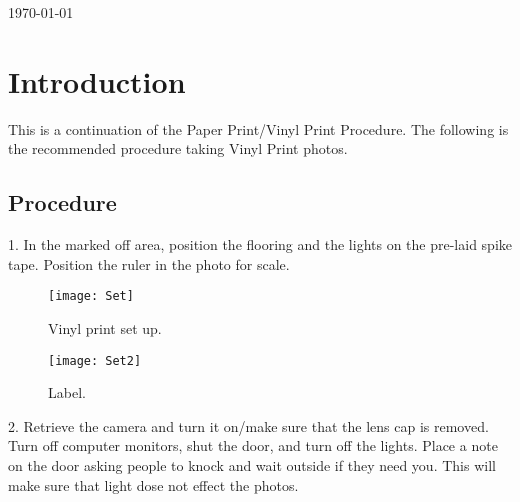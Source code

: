 \begin{titlepage}

{\large \today}\\[2cm] %



 

\vfill %

\end{titlepage}




\section{Introduction}

This is a continuation of the Paper Print/Vinyl Print Procedure. The following is the recommended procedure taking Vinyl Print photos.

\subsection{Procedure}

1. In the marked off area, position the flooring and the lights on the pre-laid spike tape. Position the ruler in the photo for scale. 

\begin{figure}[!htp]
\centering
\texttt{[image: Set]}
\caption{Vinyl print set up.}
\label{img:Set}
\end{figure}

\begin{figure}[!htp]
\centering
\texttt{[image: Set2]}
\caption{Label.}
\label{img:set2}
\end{figure}

2. Retrieve the camera and turn it on/make sure that the lens cap is removed. Turn off computer monitors, shut the door, and turn off the lights. Place a note on the door asking people to knock and wait outside if they need you. This will make sure that light dose not effect the photos.


